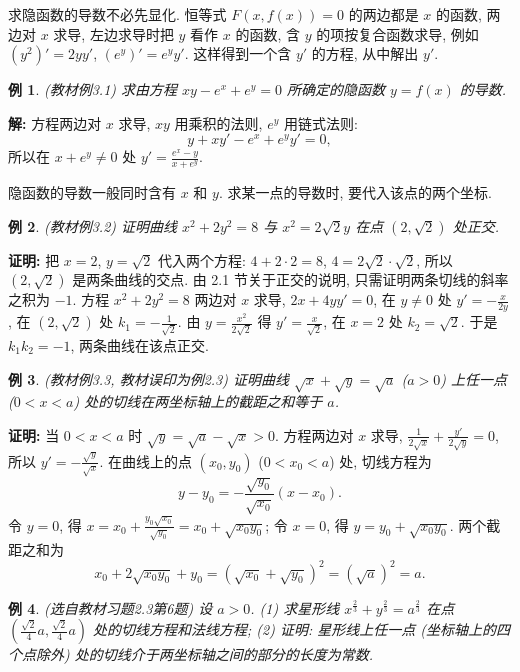 \documentclass[UTF8,openany]{ctexbook}
\theoremstyle{chinesetextbook}
\newtheorem{example}{例}[section]
\newenvironment{cnproof}{\par\indent\textbf{证明:} \ignorespaces}{\par}
\newenvironment{cnsolution}{\par\indent\textbf{解:} \ignorespaces}{\par}
\begin{document}
求隐函数的导数不必先显化. 恒等式 $F(x,f(x))=0$ 的两边都是 $x$ 的函数, 两边对 $x$ 求导, 左边求导时把 $y$ 看作 $x$ 的函数, 含 $y$ 的项按复合函数求导, 例如 $(y^2)'=2yy'$, $(e^y)'=e^yy'$. 这样得到一个含 $y'$ 的方程, 从中解出 $y'$.
\begin{example}\label{ex:c2-3-1}
\textnormal{(教材例3.1)} 求由方程 $xy-e^x+e^y=0$ 所确定的隐函数 $y=f(x)$ 的导数.
\end{example}
\begin{cnsolution}
方程两边对 $x$ 求导, $xy$ 用乘积的法则, $e^y$ 用链式法则:
\[
y+xy'-e^x+e^yy'=0,
\]
所以在 $x+e^y\ne0$ 处 $\displaystyle y'=\frac{e^x-y}{x+e^y}$.
\end{cnsolution}
隐函数的导数一般同时含有 $x$ 和 $y$. 求某一点的导数时, 要代入该点的两个坐标.
\begin{example}\label{ex:c2-3-2}
\textnormal{(教材例3.2)} 证明曲线 $x^2+2y^2=8$ 与 $x^2=2\sqrt2y$ 在点 $(2,\sqrt2)$ 处正交.
\end{example}
\begin{cnproof}
把 $x=2$, $y=\sqrt2$ 代入两个方程: $4+2\cdot2=8$, $4=2\sqrt2\cdot\sqrt2$, 所以 $(2,\sqrt2)$ 是两条曲线的交点. 由 2.1 节关于正交的说明, 只需证明两条切线的斜率之积为 $-1$. 方程 $x^2+2y^2=8$ 两边对 $x$ 求导, $2x+4yy'=0$, 在 $y\ne0$ 处 $\displaystyle y'=-\frac x{2y}$, 在 $(2,\sqrt2)$ 处 $\displaystyle k_1=-\frac1{\sqrt2}$. 由 $\displaystyle y=\frac{x^2}{2\sqrt2}$ 得 $\displaystyle y'=\frac x{\sqrt2}$, 在 $x=2$ 处 $k_2=\sqrt2$. 于是 $k_1k_2=-1$, 两条曲线在该点正交.
\end{cnproof}
\begin{example}\label{ex:c2-3-3}
\textnormal{(教材例3.3, 教材误印为例2.3)} 证明曲线 $\sqrt x+\sqrt y=\sqrt a$ ($a>0$) 上任一点 ($0<x<a$) 处的切线在两坐标轴上的截距之和等于 $a$.
\end{example}
\begin{cnproof}
当 $0<x<a$ 时 $\sqrt y=\sqrt a-\sqrt x>0$. 方程两边对 $x$ 求导, $\displaystyle\frac1{2\sqrt x}+\frac{y'}{2\sqrt y}=0$, 所以 $\displaystyle y'=-\frac{\sqrt y}{\sqrt x}$. 在曲线上的点 $(x_0,y_0)$ ($0<x_0<a$) 处, 切线方程为
\[
y-y_0=-\frac{\sqrt{y_0}}{\sqrt{x_0}}(x-x_0).
\]
令 $y=0$, 得 $\displaystyle x=x_0+\frac{y_0\sqrt{x_0}}{\sqrt{y_0}}=x_0+\sqrt{x_0y_0}$; 令 $x=0$, 得 $y=y_0+\sqrt{x_0y_0}$. 两个截距之和为
\[
x_0+2\sqrt{x_0y_0}+y_0=\left(\sqrt{x_0}+\sqrt{y_0}\right)^2=\left(\sqrt a\right)^2=a.
\]
\end{cnproof}
\begin{example}\label{ex:c2-h3-6}
\textnormal{(选自教材习题2.3第6题)} 设 $a>0$. (1) 求星形线 $x^{\frac23}+y^{\frac23}=a^{\frac23}$ 在点 $\displaystyle\left(\frac{\sqrt2}4a,\frac{\sqrt2}4a\right)$ 处的切线方程和法线方程; (2) 证明: 星形线上任一点 (坐标轴上的四个点除外) 处的切线介于两坐标轴之间的部分的长度为常数.
\end{example}
\end{document}
